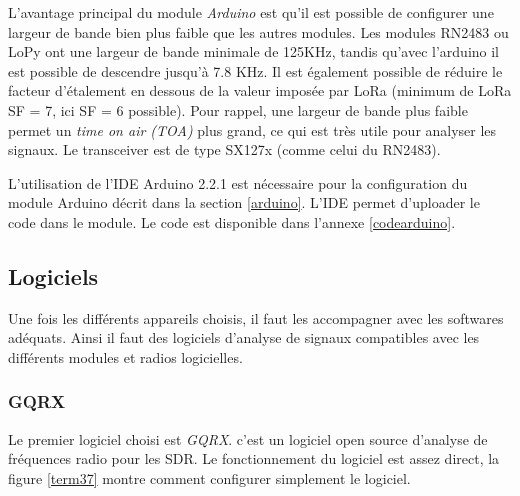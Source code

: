L'avantage principal du module \textit{Arduino} est qu'il est possible de configurer une largeur de bande bien plus faible que les autres modules. Les modules RN2483 ou LoPy ont une largeur de bande minimale de 125KHz, tandis qu'avec l'arduino il est possible de descendre jusqu'à 7.8 KHz. Il est également possible de réduire le facteur d'étalement en dessous de la valeur imposée par LoRa (minimum de LoRa SF = 7, ici SF = 6 possible). Pour rappel, une largeur de bande plus faible permet un \textit{time on air (TOA)} plus grand, ce qui est très utile pour analyser les signaux. Le transceiver est de type SX127x (comme celui du RN2483).

\vspace{0.1cm}

L'utilisation de l'IDE Arduino 2.2.1 est nécessaire pour la configuration du module Arduino décrit dans la section \ref{arduino}. L'IDE permet d'uploader le code  dans le module. Le code est disponible dans l'annexe \ref{codearduino}.

\subsection{Logiciels}\label{fft}

Une fois les différents appareils choisis, il faut les accompagner avec les softwares adéquats. Ainsi il faut des logiciels d'analyse de signaux compatibles avec les différents modules et radios logicielles.

\subsubsection{GQRX}

Le premier logiciel choisi est \textit{GQRX}. c'est un logiciel open source d'analyse de fréquences radio pour les SDR. Le fonctionnement du logiciel est assez direct, la figure \ref{term37} montre comment configurer simplement le logiciel.


